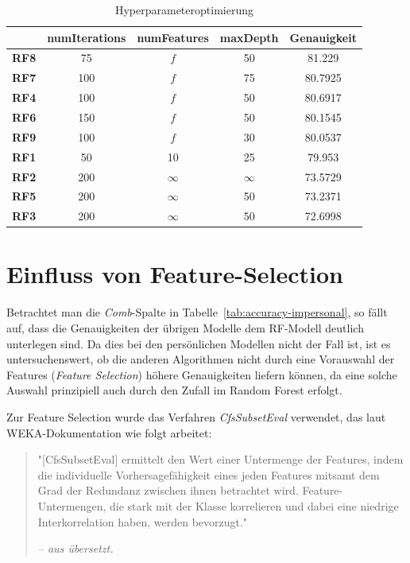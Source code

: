 \begin{table}
\centering
\begin{tabular}{|c|c|c|c||c|}
	\hline 
	& \textbf{numIterations} & \textbf{numFeatures} & \textbf{maxDepth} & \textbf{Genauigkeit} \\ 
	\hline 
	\textbf{RF8} & 75 & $f$ & 50 & 81.229 \\ 
	\hline 
	\textbf{RF7} & 100 & $f$ & 75 & 80.7925 \\ 
	\hline 
	\textbf{RF4} & 100 & $f$ & 50 & 80.6917 \\ 
	\hline 
	\textbf{RF6} & 150 & $f$ & 50 & 80.1545 \\ 
	\hline 
	\textbf{RF9} & 100 & $f$ & 30 & 80.0537 \\ 
	\hline 
	\textbf{RF1} & 50 & 10 & 25 & 79.953 \\ 
	\hline 
	\textbf{RF2} & 200 & $\infty$ & $\infty$ & 73.5729 \\ 
	\hline 
	\textbf{RF5} & 200 & $\infty$ & 50 & 73.2371 \\ 
	\hline 
	\textbf{RF3} & 200 & $\infty$ & 50 & 72.6998 \\ 
	\hline
\end{tabular}
\caption{Hyperparameteroptimierung}
\label{tab:hyperparam-opt}
\end{table}

\section{Einfluss von Feature-Selection}
Betrachtet man die \textit{Comb}-Spalte in Tabelle~\ref{tab:accuracy-impersonal}, so fällt auf, dass die Genauigkeiten der übrigen Modelle dem RF-Modell deutlich unterlegen sind. Da dies bei den persönlichen Modellen nicht der Fall ist, ist es untersuchenswert, ob die anderen Algorithmen nicht durch eine Vorauswahl der Features (\textit{Feature Selection}) höhere Genauigkeiten liefern können, da eine solche Auswahl prinzipiell auch durch den Zufall im Random Forest erfolgt.

Zur Feature Selection wurde das Verfahren \textit{CfsSubsetEval}\cite{Hall1998} verwendet, das laut WEKA-Dokumentation wie folgt arbeitet:

\begin{quote}
	"[CfsSubsetEval] ermittelt den Wert einer Untermenge der Features, indem die individuelle Vorhersagefähigkeit eines jeden Features mitsamt dem Grad der Redundanz zwischen ihnen betrachtet wird. Feature-Untermengen, die stark mit der Klasse korrelieren und dabei eine niedrige Interkorrelation haben, werden bevorzugt."
	
	\textit{-- aus \cite{WekaCfsSubsetEval} übersetzt.}
\end{quote}

